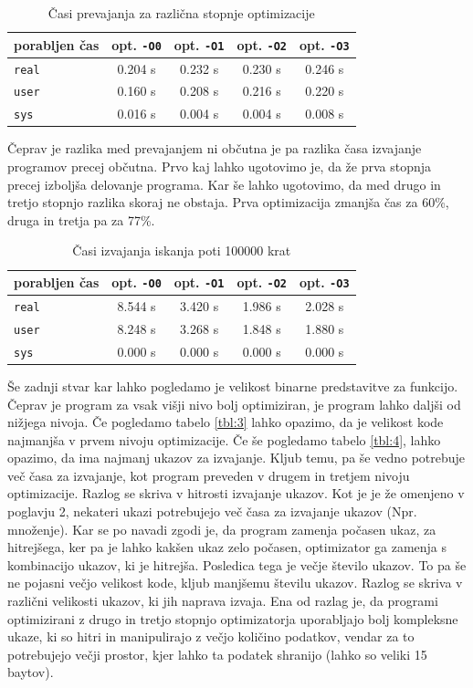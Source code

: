 \documentclass[a4paper, 12pt]{book}
\begin{document}
\begin{table}
	\begin{center}
		\begin{tabular}{l|cccc}
			porabljen čas & opt. {\tt -O0} & opt. {\tt -O1} & opt. {\tt -O2} & opt. {\tt -O3} \\ \hline
			{\tt real} & 0.204 s & 0.232 s & 0.230 s & 0.246 s \\
			{\tt user} & 0.160 s & 0.208 s & 0.216 s & 0.220 s \\
			{\tt sys}  & 0.016 s & 0.004 s & 0.004 s & 0.008 s
		\end{tabular}
	\end{center}
	\caption{Časi prevajanja za različna stopnje optimizacije}
	\label{tbl:1}
\end{table}

Čeprav je razlika med prevajanjem ni občutna je pa razlika časa izvajanje programov precej občutna. Prvo kaj lahko ugotovimo je, da že prva stopnja precej izboljša delovanje programa. Kar še lahko ugotovimo, da med drugo in tretjo stopnjo razlika skoraj ne obstaja. Prva optimizacija zmanjša čas za 60\%, druga in tretja pa za 77\%. 

\begin{table}
	\begin{center}
		\begin{tabular}{l|cccc}
			porabljen čas & opt. {\tt -O0} & opt. {\tt -O1} & opt. {\tt -O2} & opt. {\tt -O3} \\ \hline
			{\tt real} & 8.544 s & 3.420 s & 1.986 s & 2.028 s \\
			{\tt user} & 8.248 s & 3.268 s & 1.848 s & 1.880 s \\
			{\tt sys}  & 0.000 s & 0.000 s & 0.000 s & 0.000 s
		\end{tabular}
	\end{center}
	\caption{Časi izvajanja iskanja poti 100000 krat}
	\label{tbl:2}
\end{table}

Še zadnji stvar kar lahko pogledamo je velikost binarne predstavitve za funkcijo. Čeprav je program za vsak višji nivo bolj optimiziran, je program lahko daljši od nižjega nivoja. Če pogledamo tabelo \ref{tbl:3} lahko opazimo, da je velikost kode najmanjša v prvem nivoju optimizacije. Če še pogledamo tabelo \ref{tbl:4}, lahko opazimo, da ima najmanj ukazov za izvajanje. Kljub temu, pa še vedno potrebuje več časa za izvajanje, kot program preveden v drugem in tretjem nivoju optimizacije. Razlog se skriva v hitrosti izvajanje ukazov. Kot je je že omenjeno v poglavju 2, nekateri ukazi potrebujejo več časa za izvajanje ukazov (Npr. množenje). Kar se po navadi zgodi je, da program zamenja počasen ukaz, za hitrejšega, ker pa je lahko kakšen ukaz zelo počasen, optimizator ga zamenja s kombinacijo ukazov, ki je hitrejša. Posledica tega je večje število ukazov. To pa še ne pojasni večjo velikost kode, kljub manjšemu številu ukazov. Razlog se skriva v različni velikosti ukazov, ki jih naprava izvaja. Ena od razlag je, da programi optimizirani z drugo in tretjo stopnjo optimizatorja uporabljajo bolj kompleksne ukaze, ki so hitri in manipulirajo z večjo količino podatkov, vendar za to potrebujejo večji prostor, kjer lahko ta podatek shranijo (lahko so veliki 15 baytov).
\end{document}
